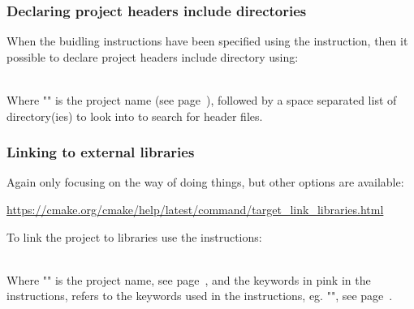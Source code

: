 \subsubsection*{Declaring project headers include directories}

When the buidling instructions have been specified using the  instruction, then it possible to declare project headers include directory using: 
\begin{script}
\end{script} \\[-0.5cm]
\noindent Where "" is the project name (see page~\pageref{cmake_pname}), followed by a space separated list of directory(ies) to look into to search for header files. 

\subsubsection*{Linking to external libraries}
\label{clink}
Again only focusing on the  way of doing things, but other options are available:
\begin{center}\href{https://cmake.org/cmake/help/latest/command/target\_link\_libraries.html}{https://cmake.org/cmake/help/latest/command/target\_link\_libraries.html} \end{center}
To link the project to libraries use the  instructions:
\begin{script}
\end{script}
\\[-0.25cm]
\noindent Where "" is the project name, see page~\pageref{cmake_pname}, and the keywords in pink in the  instructions, 
refers to the keywords used in the  instructions, eg. "\texttt{}", see page~\pageref{cmake_deps}.

